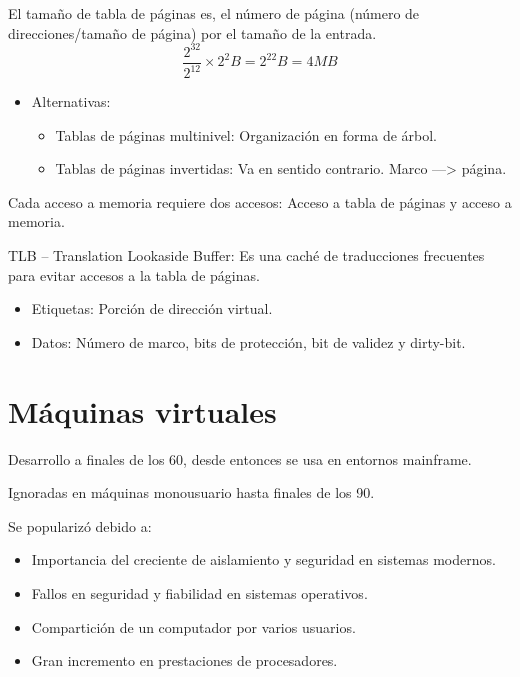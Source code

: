 \documentclass[12pt, twoside, openright]{report} %
\begin{document}
El tamaño de tabla de páginas es, el número de página (número de
direcciones/tamaño de página) por el tamaño de la entrada.
$$\frac{2^{32}}{2^{12}} \times 2^2 B = 2^22 B = 4 MB$$
\begin{itemize}
	\item Alternativas:
	      \begin{itemize}
		      \item Tablas de páginas multinivel: Organización en forma de árbol.
		      \item Tablas de páginas invertidas: Va en sentido contrario. Marco —> página.
	      \end{itemize}

\end{itemize}


Cada acceso a memoria requiere dos accesos: Acceso a tabla de
páginas y acceso a memoria.

TLB -- Translation Lookaside Buffer: Es una caché de traducciones
frecuentes para evitar accesos a la tabla de páginas.

\begin{itemize}

	\item Etiquetas: Porción de dirección virtual.
	\item Datos: Número de marco, bits de protección, bit de validez y
	      dirty-bit.
\end{itemize}

\pagebreak
\section{Máquinas virtuales}

Desarrollo a finales de los 60, desde entonces se usa en entornos
mainframe.


Ignoradas en máquinas monousuario hasta finales de los 90.


Se popularizó debido a:
\vspace{-0.5cm}

\begin{itemize}

	\item Importancia del creciente de aislamiento y seguridad en sistemas
	      modernos.
	\item Fallos en seguridad y fiabilidad en sistemas operativos.
	\item Compartición de un computador por varios usuarios.
	\item Gran incremento en prestaciones de procesadores.
\end{itemize}
\end{document}
